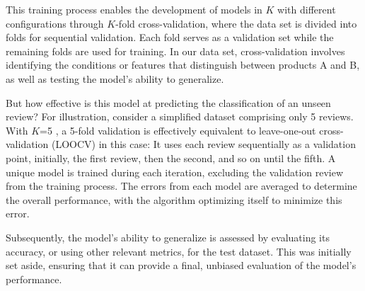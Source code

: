 This training process enables the development of models in \(K\) with
different configurations through \(K\)-fold cross-validation, where the
data set is divided into folds for sequential validation. Each fold
serves as a validation set while the remaining folds are used for
training. In our data set, cross-validation involves identifying the
conditions or features that distinguish between products A and B, as well as testing the model's ability to generalize.

But how effective is this model at predicting the classification of an
unseen review? For illustration, consider a simplified dataset comprising only 5 reviews. With \(K\)=5 , a 5-fold validation is effectively equivalent to leave-one-out cross-validation (LOOCV) in this case: It  uses each review sequentially as a validation point, initially, the first
review, then the second, and so on until the fifth. A unique model is
trained during each iteration, excluding the validation review from the
training process. The errors from each model are averaged to determine
the overall performance, with the algorithm optimizing itself to minimize this
error.

Subsequently, the model's ability to generalize is assessed by
evaluating its accuracy, or using other relevant metrics, for the test dataset. This was initially set aside, ensuring that it can provide a final,
unbiased evaluation of the model's performance.

\begin{Shaded}
\begin{Highlighting}[]
\OtherTok{\textless{}{-}} \NormalTok{(} \NormalTok{, } \NormalTok{, } \NormalTok{, } \NormalTok{)}


\OtherTok{\textless{}{-}} \SpecialCharTok{\textasciitilde{}} \NormalTok{, } \NormalTok{, } \NormalTok{)}

\end{Highlighting}
\end{Shaded}

